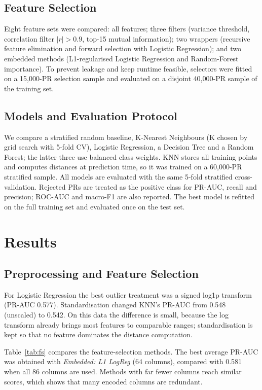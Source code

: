 \documentclass[conference]{IEEEtran}
\begin{document}
\subsection{Feature Selection}
Eight feature sets were compared: all features; three filters (variance threshold, correlation filter $|r|>0.9$, top-15 mutual information); two wrappers (recursive feature elimination and forward selection with Logistic Regression); and two embedded methods (L1-regularised Logistic Regression and Random-Forest importance). To prevent leakage and keep runtime feasible, selectors were fitted on a 15{,}000-PR selection sample and evaluated on a disjoint 40{,}000-PR sample of the training set.

\subsection{Models and Evaluation Protocol}
We compare a stratified random baseline, K-Nearest Neighbours (K chosen by grid search with 5-fold CV), Logistic Regression, a Decision Tree and a Random Forest; the latter three use balanced class weights. KNN stores all training points and computes distances at prediction time, so it was trained on a 60{,}000-PR stratified sample. All models are evaluated with the same 5-fold stratified cross-validation. Rejected PRs are treated as the positive class for PR-AUC, recall and precision; ROC-AUC and macro-F1 are also reported. The best model is refitted on the full training set and evaluated once on the test set.

\section{Results}
\subsection{Preprocessing and Feature Selection}
For Logistic Regression the best outlier treatment was a signed log1p transform (PR-AUC 0.577). Standardisation changed KNN's PR-AUC from 0.548 (unscaled) to 0.542. On this data the difference is small, because the log transform already brings most features to comparable ranges; standardisation is kept so that no feature dominates the distance computation.

Table~\ref{tab:fs} compares the feature-selection methods. The best average PR-AUC was obtained with \textit{Embedded: L1 LogReg} (64 columns), compared with 0.581 when all 86 columns are used. Methods with far fewer columns reach similar scores, which shows that many encoded columns are redundant.
\end{document}
